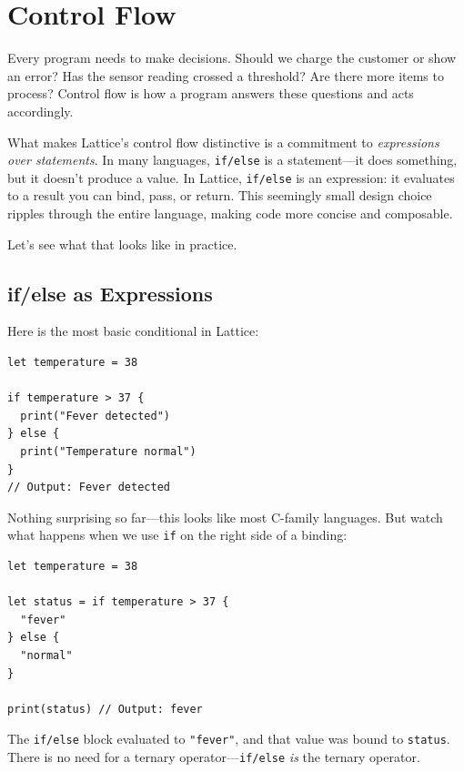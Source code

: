 \chapter{Control Flow}\label{ch:control-flow}


Every program needs to make decisions. Should we charge the customer or show an error? Has the sensor reading crossed a threshold? Are there more items to process? Control flow is how a program answers these questions and acts accordingly.

What makes Lattice's control flow distinctive is a commitment to \emph{expressions over statements}. In many languages, \lstinline|if/else| is a statement---it does something, but it doesn't produce a value. In Lattice, \lstinline|if/else| is an expression: it evaluates to a result you can bind, pass, or return. This seemingly small design choice ripples through the entire language, making code more concise and composable.

Let's see what that looks like in practice.

\section{if/else as Expressions}\label{sec:if-else-expressions}

Here is the most basic conditional in Lattice:

\begin{lstlisting}[language=Lattice, caption={A basic if/else}]
let temperature = 38

if temperature > 37 {
  print("Fever detected")
} else {
  print("Temperature normal")
}
// Output: Fever detected
\end{lstlisting}

Nothing surprising so far---this looks like most C-family languages. But watch what happens when we use \lstinline|if| on the right side of a binding:

\begin{lstlisting}[language=Lattice, caption={if/else as an expression}]
let temperature = 38

let status = if temperature > 37 {
  "fever"
} else {
  "normal"
}

print(status) // Output: fever
\end{lstlisting}

The \lstinline|if/else| block evaluated to \lstinline|"fever"|, and that value was bound to \lstinline|status|. There is no need for a ternary operator---\lstinline|if/else| \emph{is} the ternary operator.


